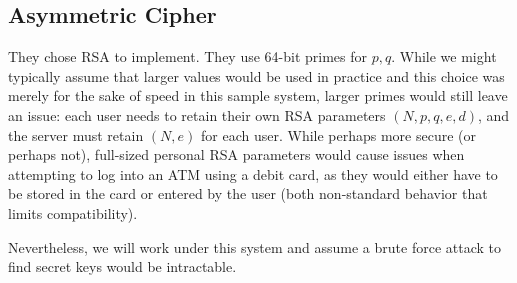 \documentclass{article}
\begin{document}
\subsection{Asymmetric Cipher}
They chose RSA to implement. They use 64-bit primes for $p,q$. While we might typically assume that larger values would be used in practice and this choice was merely for the sake of speed in this sample system, larger primes would still leave an issue: each user needs to retain their own RSA parameters $(N, p, q, e, d)$, and the server must retain $(N, e)$ for each user. While perhaps more secure (or perhaps not), full-sized personal RSA parameters would cause issues when attempting to log into an ATM using a debit card, as they would either have to be stored in the card or entered by the user (both non-standard behavior that limits compatibility).

Nevertheless, we will work under this system and assume a brute force attack to find secret keys would be intractable.

\pagebreak[3]
\end{document}

